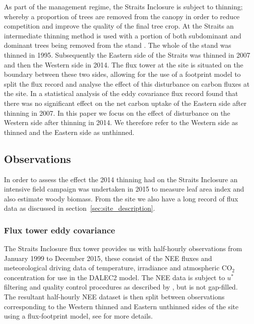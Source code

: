 \documentclass[11pt]{article}
\begin{document}
As part of the management regime, the Straits Inclosure is subject to thinning; whereby a proportion of trees are removed from the canopy in order to reduce competition and improve the quality of the final tree crop. At the Straits an intermediate thinning method is used with a portion of both subdominant and dominant trees being removed from the stand \citep{kerr2011thinning}. The whole of the stand was thinned in 1995. Subsequently the Eastern side of the Straits was thinned in 2007 and then the Western side in 2014. The flux tower at the site is situated on the boundary between these two sides, allowing for the use of a footprint model to split the flux record and analyse the effect of this disturbance on carbon fluxes at the site. In \citet{wilkinson2015effects} a statistical analysis of the eddy covariance flux record found that there was no significant effect on the net carbon uptake of the Eastern side after thinning in 2007. In this paper we focus on the effect of disturbance on the Western side after thinning in 2014. We therefore refer to the Western side as thinned and the Eastern side as unthinned.   

\subsection{Observations} \label{sec:obs}

In order to assess the effect the 2014 thinning had on the Straits Inclosure an intensive field campaign was undertaken in 2015 to measure leaf area index and also estimate woody biomass. From the site we also have a long record of flux data as discussed in section~\ref{sec:site_description}.

\subsubsection{Flux tower eddy covariance} \label{sec:eddycov} 

The Straits Inclosure flux tower provides us with half-hourly observations from January 1999 to December 2015, these consist of the NEE fluxes and meteorological driving data of temperature, irradiance and atmospheric CO\(_{2}\) concentration for use in the DALEC2 model. The NEE data is subject to \(u^*\) filtering and quality control procedures as described by \citet{papale2006towards}, but is not gap-filled. The resultant half-hourly NEE dataset is then split between observations corresponding to the Western thinned and Eastern unthinned sides of the site using a flux-footprint model, see \citet{wilkinson2015effects} for more details.  
\end{document}
